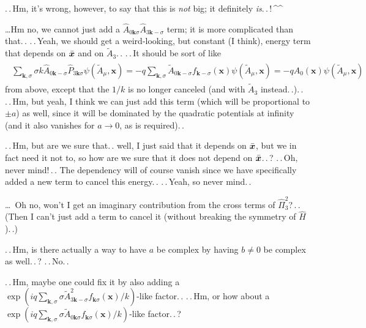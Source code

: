 \documentclass{report}
\newcommand{\bsacc}[3]{#1{\boldsymbol{#2}\hspace{#3em}}\hspace{-#3em}}
\newcommand{\barbsx}{{\bsacc{\bar}{x}{.05}}}
\begin{document}
.\,.\,Hm, it's wrong, however, to say that this is \emph{not} big; it definitely \emph{is}.\,.\,!\,\textasciicircum\textasciicircum\ %

\ldots Hm no, we cannot just add a $\hat{A}_{0 \boldsymbol k \sigma} \hat{A}_{3 \boldsymbol k -\sigma}$ term; it is more complicated than that.\,. .\,.\,Yeah, we should get a weird-looking, but constant (I think), energy term that depends on $\barbsx$ and on $\tilde A_3$.\,. .\,.\,It should be sort of like
\begin{align}
\begin{aligned}
	\sum_{\boldsymbol k, \sigma} 
		\sigma k \hat{A}_{0 \boldsymbol k -\sigma} 
		\hat P_{3 \boldsymbol k \sigma} 
		\psi(\tilde A_\mu, \boldsymbol{x}) 
	= 
	-q\sum_{\boldsymbol k, \sigma}
		\tilde A_{0 \boldsymbol k -\sigma} 
		f_{\boldsymbol{k} -\sigma}(\boldsymbol{x}) 
		\psi(\tilde A_\mu, \boldsymbol{x})
	= 
	-q A_0(\boldsymbol{x}) \psi(\tilde A_\mu, \boldsymbol{x})
\end{aligned}
\end{align}
from above, except that the $1/k$ is no longer canceled (and with $\tilde A_3$ instead.\,.).\,. .\,.\,Hm, but yeah, I think we can just add this term (which will be proportional to $\pm a$) as well, since it will be dominated by the quadratic potentials at infinity (and it also vanishes for $a\to 0$, as is required).\,. 

.\,.\,Hm, but are we sure that.\,. well, I just said that it depends on $\barbsx$, but we in fact need it not to, so how are we sure that it does not depend on $\barbsx$.\,.\,? .\,.\,Oh, never mind!\,.\,. The dependency will of course vanish since we have specifically added a new term to cancel this energy.\,. .\,.\,Yeah, so never mind.\,. 

\ldots\ Oh no, won't I get an imaginary contribution from the cross terms of $\hat \Pi_3^2$?\,.\,. (Then I can't just add a term to cancel it (without breaking the symmetry of $\hat H$).\,.) 

.\,.\,Hm, is there actually a way to have $a$ be complex by having $b\neq 0$ be complex as well.\,.\,? .\,.\,No.\,. 

.\,.\,Hm, maybe one could fix it by also adding a
$\exp(
	i q \sum_{\boldsymbol{k}, \sigma} \sigma \tilde A_{3\boldsymbol{k}-\sigma}^2 
	f_{\boldsymbol{k}\sigma}(\boldsymbol{x}) / k
)$-like factor.\,. %
.\,.\,Hm, or how about a 
$\exp(
	i q \sum_{\boldsymbol{k}, \sigma} \sigma \tilde A_{0\boldsymbol{k}\sigma} 
	f_{\boldsymbol{k}\sigma}(\boldsymbol{x}) / k
)$-like factor.\,.\,? 
\end{document}
